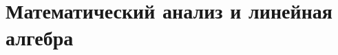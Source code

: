 \documentclass[../../book-ru.tex]{subfiles}
\begin{document}
\chapter{Математический анализ и линейная алгебра}
\label{ch:1.1-calculus-linalg-ru}















\end{document}
